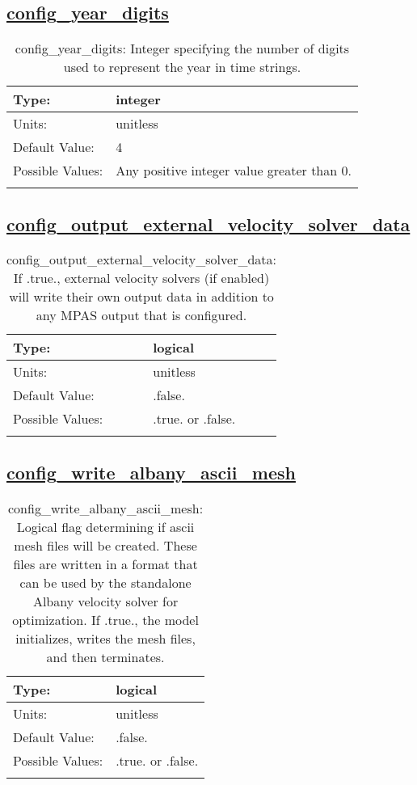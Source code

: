 \subsection[config\_year\_digits]{\hyperref[sec:nm_tab_io]{config\_year\_digits}}
\label{subsec:nm_sec_config_year_digits}
\begin{center}
\begin{longtable}{| p{2.0in} || p{4.0in} |}
    \hline
    Type: & integer \\
    \hline
    Units: & \si{unitless} \\
    \hline
    Default Value: & 4 \\
    \hline
    Possible Values: & Any positive integer value greater than 0. \\
    \hline
    \caption{config\_year\_digits: Integer specifying the number of digits used to represent the year in time strings.}
\end{longtable}
\end{center}
\subsection[config\_output\_external\_velocity\_solver\_data]{\hyperref[sec:nm_tab_io]{config\_output\_external\_velocity\_solver\_data}}
\label{subsec:nm_sec_config_output_external_velocity_solver_data}
\begin{center}
\begin{longtable}{| p{2.0in} || p{4.0in} |}
    \hline
    Type: & logical \\
    \hline
    Units: & \si{unitless} \\
    \hline
    Default Value: & .false. \\
    \hline
    Possible Values: & .true. or .false. \\
    \hline
    \caption{config\_output\_external\_velocity\_solver\_data: If .true., external velocity solvers (if enabled) will write their own output data in addition to any MPAS output that is configured.}
\end{longtable}
\end{center}
\subsection[config\_write\_albany\_ascii\_mesh]{\hyperref[sec:nm_tab_io]{config\_write\_albany\_ascii\_mesh}}
\label{subsec:nm_sec_config_write_albany_ascii_mesh}
\begin{center}
\begin{longtable}{| p{2.0in} || p{4.0in} |}
    \hline
    Type: & logical \\
    \hline
    Units: & \si{unitless} \\
    \hline
    Default Value: & .false. \\
    \hline
    Possible Values: & .true. or .false. \\
    \hline
    \caption{config\_write\_albany\_ascii\_mesh: Logical flag determining if ascii mesh files will be created.  These files are written in a format that can be used by the standalone Albany velocity solver for optimization.  If .true., the model initializes, writes the mesh files, and then terminates.}
\end{longtable}
\end{center}
